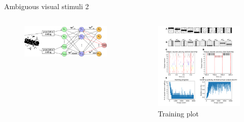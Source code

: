 \documentclass[aspectratio=169]{beamer}
\begin{document}
\begin{frame}{Ambiguous visual stimuli 2}
\vspace{-1.5cm}
  \begin{columns}
    \begin{column}{0.5\textwidth}
       \begin{figure}
        \includegraphics[width=0.98\linewidth]{../inkscape/networkPlanExperiment1.png}
      \end{figure} 
    \end{column}
    \begin{column}{0.5\textwidth}
        \begin{figure}
        \includegraphics[width=0.8\linewidth]{../Latex/figures/horvertAdaptiveInh/trainingPlotCropped.png}
      \\   \footnotesize Training plot
      \end{figure} 
    \end{column}
  \end{columns}
\end{frame}
\end{document}

